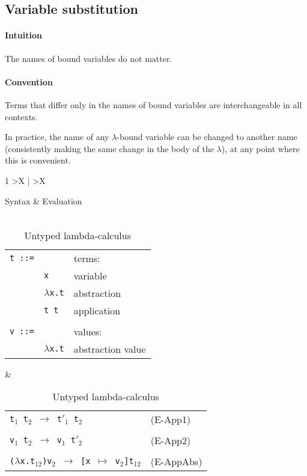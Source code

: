 \documentclass{article}
\begin{document}
\subsection{Variable substitution}

\paragraph{Intuition} The names of bound variables do not matter.

\paragraph{Convention} Terms that differ only in the names of bound variables are interchangeable in all contexts.

In practice, the name of any \(\lambda\)-bound variable can be changed to another name (consistently making the same change in the body of the \(\lambda\)), at any point where this is convenient.

\begin{table}[h!]
\begin{tabularx}{1\textwidth} 
  {   >{}X
    | >{}X }

    Syntax & Evaluation 
    \\\\
    {
    \begin{tabularx}{1\linewidth}
    { >{\raggedright\arraybackslash}l 
      >{\raggedright\arraybackslash}l
      >{\raggedleft\arraybackslash}X }
      
      \texttt{t ::=} & & terms: \\
      & \texttt{x} & variable \\
      & \texttt{\(\lambda\)x.t} & abstraction \\
      & \texttt{t t} & application \\
      \\
      \texttt{v ::=} & & values: \\
      & \texttt{\(\lambda\)x.t} & abstraction value \\
      
    \end{tabularx}
    }
    &
    {
    \begin{tabularx}{1\linewidth}
    { >{\raggedright\arraybackslash\texttt}l 
      >{\raggedleft\arraybackslash}X }
      
      \inference[]
      {\texttt{t$_1$ $\rightarrow$ t$'_1$}}
      {\texttt{t$_1$ t$_2$ $\rightarrow$ t$'_1$ t$_2$}} & (E-App1)
      \\\\
      \inference[]
      {\texttt{t$_2$ $\rightarrow$ t$'_2$}}
      {\texttt{v$_1$ t$_2$ $\rightarrow$ v$_1$ t$'_2$}} & (E-App2)
      \\\\
      \texttt{($\lambda$x.t$_{12}$)v$_2$ $\rightarrow$ 
      [x $\mapsto$ v$_2$]t$_{12}$} & (E-AppAbs)
      
    \end{tabularx}
    }

\end{tabularx}
\caption{Untyped lambda-calculus}
\label{untyped}
\end{table}
\end{document}
